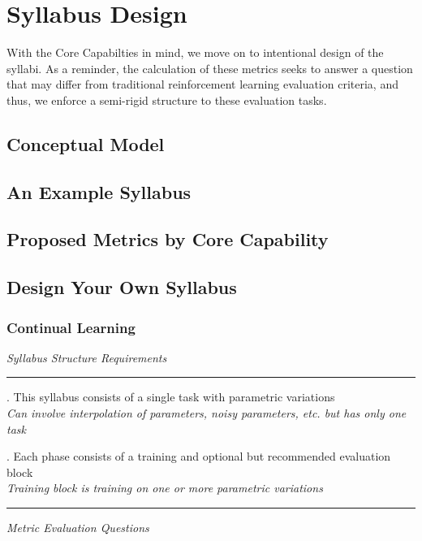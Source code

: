 \chapter{Syllabus Design}\label{ch:syllabus_design}

With the Core Capabilties in mind, we move on to intentional design of the syllabi. As a reminder, the calculation of these metrics seeks to answer a question that may differ from traditional reinforcement learning evaluation criteria, and thus, we enforce a semi-rigid structure to these evaluation tasks.

\section{Conceptual Model}

\section{An Example Syllabus}
    
\section{Proposed Metrics by Core Capability}

\section{Design Your Own Syllabus}

\subsection*{Continual Learning} 
\textit{Syllabus Structure Requirements}\\
\noindent\rule{8cm}{0.4pt}
. This syllabus consists of a single task with parametric variations\\
\textit{Can involve interpolation of parameters, noisy parameters, etc. but has only one task \\}


. Each phase consists of a training and optional but recommended evaluation block\\
\textit{Training block is training on one or more parametric variations \\}
\noindent\rule{8cm}{0.4pt}

\flushleft\textit{Metric Evaluation Questions}\\[0.1in]

